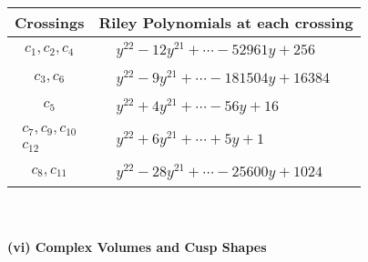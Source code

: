 \documentclass[1p]{elsarticle_modified}
\theoremstyle{definition}
\begin{document}
\begin{tabular}{m{50pt}|m{274pt}}
Crossings & \hspace{64pt}Riley Polynomials at each crossing \\
\hline $$\begin{aligned}c_{1},c_{2},c_{4}\end{aligned}$$&$\begin{aligned}
&y^{22}-12 y^{21}+\cdots-52961 y+256
\end{aligned}$\\
\hline $$\begin{aligned}c_{3},c_{6}\end{aligned}$$&$\begin{aligned}
&y^{22}-9 y^{21}+\cdots-181504 y+16384
\end{aligned}$\\
\hline $$\begin{aligned}c_{5}\end{aligned}$$&$\begin{aligned}
&y^{22}+4 y^{21}+\cdots-56 y+16
\end{aligned}$\\
\hline $$\begin{aligned}c_{7},c_{9},c_{10}\\c_{12}\end{aligned}$$&$\begin{aligned}
&y^{22}+6 y^{21}+\cdots+5 y+1
\end{aligned}$\\
\hline $$\begin{aligned}c_{8},c_{11}\end{aligned}$$&$\begin{aligned}
&y^{22}-28 y^{21}+\cdots-25600 y+1024
\end{aligned}$\\
\hline
\end{tabular}\\~\\
\newpage\flushleft \textbf{(vi) Complex Volumes and Cusp Shapes}
\end{document}
